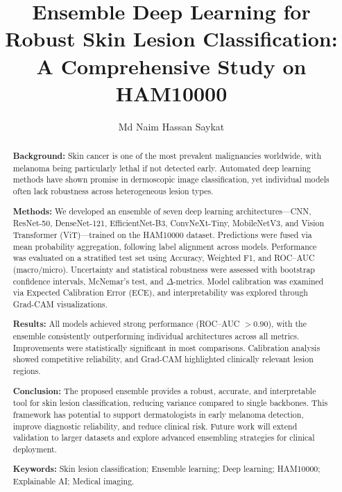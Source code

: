 \documentclass[preprint,12pt]{elsarticle}
\begin{document}
\begin{frontmatter}

\title{Ensemble Deep Learning for Robust Skin Lesion Classification:\\
A Comprehensive Study on HAM10000}

\author[inst1]{Md Naim Hassan Saykat}
\address[inst1]{Department of Computer Science, Université Paris-Saclay, Orsay, France}


\begin{abstract}
\textbf{Background:} Skin cancer is one of the most prevalent malignancies worldwide, with melanoma being particularly lethal if not detected early. Automated deep learning methods have shown promise in dermoscopic image classification, yet individual models often lack robustness across heterogeneous lesion types.

\textbf{Methods:} We developed an ensemble of seven deep learning architectures---CNN, ResNet-50, DenseNet-121, EfficientNet-B3, ConvNeXt-Tiny, MobileNetV3, and Vision Transformer (ViT)---trained on the HAM10000 dataset. Predictions were fused via mean probability aggregation, following label alignment across models. Performance was evaluated on a stratified test set using Accuracy, Weighted F1, and ROC--AUC (macro/micro). Uncertainty and statistical robustness were assessed with bootstrap confidence intervals, McNemar’s test, and $\Delta$-metrics. Model calibration was examined via Expected Calibration Error (ECE), and interpretability was explored through Grad-CAM visualizations.

\textbf{Results:} All models achieved strong performance (ROC--AUC $>0.90$), with the ensemble consistently outperforming individual architectures across all metrics. Improvements were statistically significant in most comparisons. Calibration analysis showed competitive reliability, and Grad-CAM highlighted clinically relevant lesion regions.

\textbf{Conclusion:} The proposed ensemble provides a robust, accurate, and interpretable tool for skin lesion classification, reducing variance compared to single backbones. This framework has potential to support dermatologists in early melanoma detection, improve diagnostic reliability, and reduce clinical risk. Future work will extend validation to larger datasets and explore advanced ensembling strategies for clinical deployment.

\textbf{Keywords:} Skin lesion classification; Ensemble learning; Deep learning; HAM10000; Explainable AI; Medical imaging.
\end{abstract}

\end{frontmatter}
\end{document}
